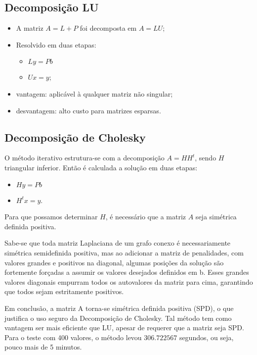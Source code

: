 \documentclass{article} %
\theoremstyle{definition}
\begin{document}
        \subsection{Decomposição LU}
            \begin{itemize}
                \item A matriz $A = L + P$ foi decomposta em  $A = LU$;
                \item Resolvido em duas etapas:
                    \begin{itemize}[a)]
                        \item $Ly = Pb$
                        \item  $Ux = y$;
                    \end{itemize}
                \item vantagem: aplicável à qualquer matriz não singular;
                \item desvantagem: alto custo para matrizes esparsas.
            \end{itemize}
        \subsection{Decomposição de Cholesky}
            
O método iterativo estrutura-se com a decomposição $A = HH^t$, sendo $H$ triangular inferior.
Então é calculada a solução em duas etapas:
\begin{itemize}[a)]
    \item $Hy = Pb$
    \item  $H^tx = y$.
\end{itemize}
Para que possamos determinar $H$, é necessário que a matriz $A$ seja simétrica definida positiva.

Sabe-se que toda matriz Laplaciana de um grafo conexo é necessariamente simétrica semidefinida
positiva, mas ao adicionar a matriz de penalidades, com valores grandes e positivos na diagonal,
algumas posições da solução são fortemente forçadas a assumir os valores desejados definidos em b.
Esses grandes valores diagonais empurram todos os autovalores da matriz para cima, garantindo
que todos sejam estritamente positivos.

Em conclusão, a matriz A torna-se simétrica definida positiva
(SPD), o que justifica o uso seguro da Decomposição de Cholesky.
Tal método tem como vantagem ser mais eficiente que LU, apesar de requerer que a matriz seja SPD.
Para o teste com 400 valores, o método levou $306.722567$ segundos, ou seja, pouco mais de 5 minutos.
\end{document}
